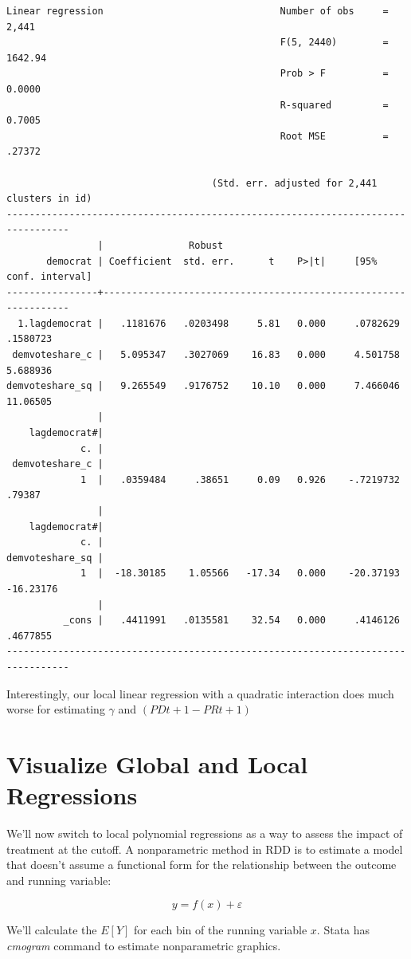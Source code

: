 \documentclass[
]{book}
\begin{document}
\begin{verbatim}
Linear regression                               Number of obs     =      2,441
                                                F(5, 2440)        =    1642.94
                                                Prob > F          =     0.0000
                                                R-squared         =     0.7005
                                                Root MSE          =     .27372

                                    (Std. err. adjusted for 2,441 clusters in id)
---------------------------------------------------------------------------------
                |               Robust
       democrat | Coefficient  std. err.      t    P>|t|     [95% conf. interval]
----------------+----------------------------------------------------------------
  1.lagdemocrat |   .1181676   .0203498     5.81   0.000     .0782629    .1580723
 demvoteshare_c |   5.095347   .3027069    16.83   0.000     4.501758    5.688936
demvoteshare_sq |   9.265549   .9176752    10.10   0.000     7.466046    11.06505
                |
    lagdemocrat#|
             c. |
 demvoteshare_c |
             1  |   .0359484     .38651     0.09   0.926    -.7219732      .79387
                |
    lagdemocrat#|
             c. |
demvoteshare_sq |
             1  |  -18.30185    1.05566   -17.34   0.000    -20.37193   -16.23176
                |
          _cons |   .4411991   .0135581    32.54   0.000     .4146126    .4677855
---------------------------------------------------------------------------------
\end{verbatim}

Interestingly, our local linear regression with a quadratic interaction does much worse for estimating \(\gamma\) and \((PDt+1 - PRt+1)\)

\chapter{Visualize Global and Local Regressions}\label{visualize-global-and-local-regressions}

We'll now switch to local polynomial regressions as a way to assess the impact of treatment at the cutoff. A nonparametric method in RDD is to estimate a model that doesn't assume a functional form for the relationship between the outcome and running variable:

\[ y=f(x)+\varepsilon \]

We'll calculate the \(E[Y]\) for each bin of the running variable \(x\). Stata has \emph{cmogram} command to estimate nonparametric graphics.
\end{document}
